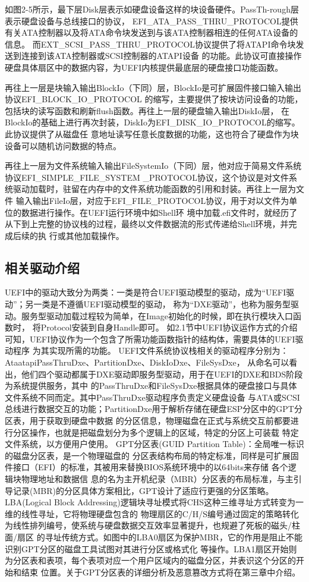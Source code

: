 如图2-5所示，最下层Disk层表示如硬盘设备这样的块设备硬件。PassTh-\newline rough层表示硬盘设备与总线接口的协议，
EFI\_ATA\_PASS\_THRU\_PROTOCOL提供有关ATA控制器以及将ATA命令块发送到与该ATA控制器相连的任何ATA设备的信息。
而EXT\_SCSI\_PASS\_THRU\_PROTOCOL协议提供了将ATAPI命令块发送到连接到该ATA控制器或SCSI控制器的ATAPI设备
的功能。此协议可直接操作硬盘具体扇区中的数据内容，为UEFI内核提供最底层的硬盘接口功能函数。
\par 再往上一层是块输入输出BlockIo（下同）层，BlockIo是可扩展固件接口输入输出协议EFI\_BLOCK\_IO\_PROTOCOL
的缩写，主要提供了按块访问设备的功能，包括块的读写函数和刷新flush函数。再往上一层的硬盘输入输出DiskIo层，
在BlockIo的基础上进行再次封装，DiskIo为EFI\_DISK\_IO\_PROTOCOL的缩写。此协议提供了从磁盘任
意地址读写任意长度数据的功能，这也符合了硬盘作为块设备可以随机访问数据的特点。
\par 再往上一层为文件系统输入输出FileSystemIo（下同）层，他对应于简易文件系统协议EFI\_SIMPLE\_FILE\_SYSTEM
\_PROTOCOL协议，这个协议是对文件系统驱动加载时，驻留在内存中的文件系统功能函数的引用和封装。再往上一层为文件
输入输出FileIo层，对应于EFI\_FILE\_PROTOCOL协议，用于对以文件为单位的数据进行操作。在UEFI运行环境中如Shell环
境中加载.efi文件时，就经历了从下到上完整的协议栈的过程，最终以文件数据流的形式传递给Shell环境，并完成后续的执
行或其他加载操作。

\subsection{相关驱动介绍}
UEFI中的驱动大致分为两类：一类是符合UEFI驱动模型的驱动，成为“UEFI驱动”；另一类是不遵循UEFI驱动模型的驱动，
称为“DXE驱动”，也称为服务型驱动。服务型驱动加载过程较为简单，在Image初始化的时候，即在执行模块入口函数时，
将Protocol安装到自身Handle即可。
如2.1节中UEFI协议运作方式的介绍可知，UEFI协议作为一个包含了所需功能函数指针的结构体，需要具体的UEFI驱动程序
为其实现所需的功能。
UEFI文件系统协议栈相关的驱动程序分别为：AtaatapiPassThruDxe、PartitionDxe、DiskIoDxe、FileSysDxe，
从命名可以看出，他们四个驱动都属于DXE驱动即服务型驱动，用于在UEFI的DXE和BDS阶段为系统提供服务，其中
的PassThruDxe和FileSysDxe根据具体的硬盘接口与具体文件系统不同而定。其中PassThruDxe驱动程序负责定义硬盘设备
与ATA或SCSI总线进行数据交互的功能；PartitionDxe用于解析存储在硬盘ESP分区中的GPT分区表，用于获取到硬盘中数据
的分区信息，物理磁盘在正式与系统交互前都要进行分区操作，也就是把磁盘划分为多个逻辑上的区域，特定的分区上可装载
特定文件系统，以方便用户使用。
GPT分区表(GUID Partition Table)：全局唯一标识的磁盘分区表\cite{extra3}，是一个物理磁盘的
分区表结构布局的特定标准，同样是可扩展固件接口（EFI）的标准，其被用来替换BIOS系统环境中的以64bits来存储
各个逻辑块物理地址和数据信
息的名为主开机纪录（MBR）分区表的布局标准，与主引导记录(MBR)的分区具体方案相比，GPT设计了适应行更强的分区策略。
LBA(Logical Block Addressing)逻辑块寻址模式将CHS这种三维寻址方式转变为一维的线性寻址，它将物理硬盘包含的
物理扇区的C/H/S编号通过固定的策略转化为线性排列编号，使系统与硬盘数据交互效率显著提升，也规避了死板的磁头/柱面/扇区
的寻址传统方式。如图中的LBA0扇区为保护MBR，它的作用是阻止不能识别GPT分区的磁盘工具试图对其进行分区或格式化
等操作。LBA1扇区开始则为分区表和表项，每个表项对应一个用户区域内的磁盘分区，并表识这个分区的开始和结束
位置。关于GPT分区表的详细分析及恶意篡改方式将在第三章中介绍。

